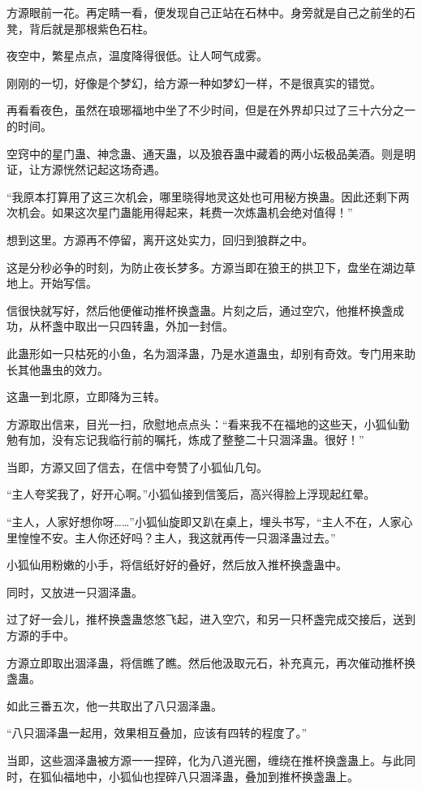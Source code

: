 \begin{this_body}
方源眼前一花。再定睛一看，便发现自己正站在石林中。身旁就是自己之前坐的石凳，背后就是那根紫色石柱。

夜空中，繁星点点，温度降得很低。让人呵气成雾。

刚刚的一切，好像是个梦幻，给方源一种如梦幻一样，不是很真实的错觉。

再看看夜色，虽然在琅琊福地中坐了不少时间，但是在外界却只过了三十六分之一的时间。

空窍中的星门蛊、神念蛊、通天蛊，以及狼吞蛊中藏着的两小坛极品美酒。则是明证，让方源恍然记起这场奇遇。

“我原本打算用了这三次机会，哪里晓得地灵这处也可用秘方换蛊。因此还剩下两次机会。如果这次星门蛊能用得起来，耗费一次炼蛊机会绝对值得！”

想到这里。方源再不停留，离开这处实力，回归到狼群之中。

这是分秒必争的时刻，为防止夜长梦多。方源当即在狼王的拱卫下，盘坐在湖边草地上。开始写信。

信很快就写好，然后他便催动推杯换盏蛊。片刻之后，通过空穴，他推杯换盏成功，从杯盏中取出一只四转蛊，外加一封信。

此蛊形如一只枯死的小鱼，名为涸泽蛊，乃是水道蛊虫，却别有奇效。专门用来助长其他蛊虫的效力。

这蛊一到北原，立即降为三转。

方源取出信来，目光一扫，欣慰地点点头：“看来我不在福地的这些天，小狐仙勤勉有加，没有忘记我临行前的嘱托，炼成了整整二十只涸泽蛊。很好！”

当即，方源又回了信去，在信中夸赞了小狐仙几句。

“主人夸奖我了，好开心啊。”小狐仙接到信笺后，高兴得脸上浮现起红晕。

“主人，人家好想你呀……”小狐仙旋即又趴在桌上，埋头书写，“主人不在，人家心里惶惶不安。主人你还好吗？主人，我这就再传一只涸泽蛊过去。”

小狐仙用粉嫩的小手，将信纸好好的叠好，然后放入推杯换盏蛊中。

同时，又放进一只涸泽蛊。

过了好一会儿，推杯换盏蛊悠悠飞起，进入空穴，和另一只杯盏完成交接后，送到方源的手中。

方源立即取出涸泽蛊，将信瞧了瞧。然后他汲取元石，补充真元，再次催动推杯换盏蛊。

如此三番五次，他一共取出了八只涸泽蛊。

“八只涸泽蛊一起用，效果相互叠加，应该有四转的程度了。”

当即，这些涸泽蛊被方源一一捏碎，化为八道光圈，缠绕在推杯换盏蛊上。与此同时，在狐仙福地中，小狐仙也捏碎八只涸泽蛊，叠加到推杯换盏蛊上。


\end{this_body}
